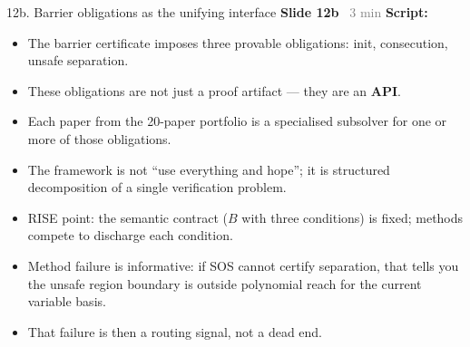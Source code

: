 \documentclass[aspectratio=169]{beamer}
\newcommand{\syncline}[2]{\textbf{#1} \hfill \textcolor{gray}{#2}}
\begin{document}
\begin{frame}{12b. Barrier obligations as the unifying interface}
\syncline{Slide 12b}{~3 min}
\textbf{Script:}
\begin{itemize}
  \item The barrier certificate imposes three provable obligations: init, consecution, unsafe separation.
  \item These obligations are not just a proof artifact --- they are an \textbf{API}.
  \item Each paper from the 20-paper portfolio is a specialised subsolver for one or more of those obligations.
  \item The framework is not ``use everything and hope''; it is structured decomposition of a single verification problem.
  \item RISE point: the semantic contract (\(B\) with three conditions) is fixed; methods compete to discharge each condition.
  \item Method failure is informative: if SOS cannot certify separation, that tells you the unsafe region boundary is outside polynomial reach for the current variable basis.
  \item That failure is then a routing signal, not a dead end.
\end{itemize}
\end{frame}
\end{document}

